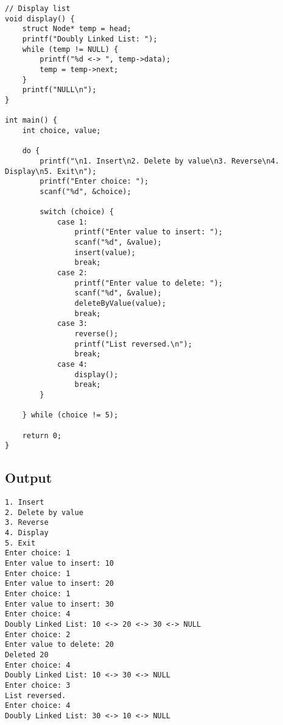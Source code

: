 \documentclass[12pt,a4paper]{article}
\begin{document}
\begin{lstlisting}
// Display list
void display() {
    struct Node* temp = head;
    printf("Doubly Linked List: ");
    while (temp != NULL) {
        printf("%d <-> ", temp->data);
        temp = temp->next;
    }
    printf("NULL\n");
}

int main() {
    int choice, value;

    do {
        printf("\n1. Insert\n2. Delete by value\n3. Reverse\n4. Display\n5. Exit\n");
        printf("Enter choice: ");
        scanf("%d", &choice);

        switch (choice) {
            case 1:
                printf("Enter value to insert: ");
                scanf("%d", &value);
                insert(value);
                break;
            case 2:
                printf("Enter value to delete: ");
                scanf("%d", &value);
                deleteByValue(value);
                break;
            case 3:
                reverse();
                printf("List reversed.\n");
                break;
            case 4:
                display();
                break;
        }

    } while (choice != 5);

    return 0;
}
\end{lstlisting}

\subsection*{Output}
\begin{tcolorbox}[terminalstyle, title=Sample Output]
\texttt{1. Insert\\2. Delete by value\\3. Reverse\\4. Display\\5. Exit\\
Enter choice: 1\\
Enter value to insert: 10\\
Enter choice: 1\\
Enter value to insert: 20\\
Enter choice: 1\\
Enter value to insert: 30\\
Enter choice: 4\\
Doubly Linked List: 10 <-> 20 <-> 30 <-> NULL\\
Enter choice: 2\\
Enter value to delete: 20\\
Deleted 20\\
Enter choice: 4\\
Doubly Linked List: 10 <-> 30 <-> NULL\\
Enter choice: 3\\
List reversed.\\
Enter choice: 4\\
Doubly Linked List: 30 <-> 10 <-> NULL}
\end{tcolorbox}
\end{document}
